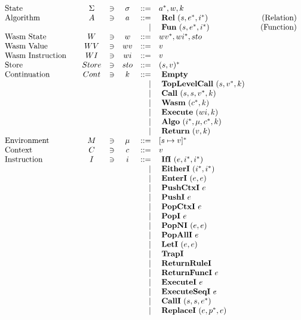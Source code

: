 \begin{align*}
\begin{array}{lcccrlr}
%
  \text{State}\quad& \Sigma &\ni& \sigma & ::=& \seq a, w, k \\
%
  \text{Algorithm}\quad& A &\ni& a &::=& ~ \rel ~ (s, \seq e, \seq i) &\quad\text{(Relation)} \\
  &&&& | & ~ \fun ~ (s, \seq e, \seq i) &\quad\text{(Function)} \\
%
  \text{Wasm State}\quad& W &\ni& w &::=& \seq{wv}, \seq{wi}, sto \\
  \text{Wasm Value}\quad& WV &\ni& wv &::=& v \\
  \text{Wasm Instruction}\quad& WI &\ni& wi &::=& v \\
%
  \text{Store}\quad& Store &\ni& sto &::=& \seq{(s, v)} \\
%
  \text{Continuation}\quad & Cont &\ni& k &::=& ~ \mt \\
    &&&& | & ~ \toplevelcall ~ (s, \seq v, k) \\
    &&&& | & ~ \call ~ (s, s, \seq v, k) \\
    &&&& | & ~ \wasm ~ (\seq c, k) \\
    &&&& | & ~ \exe ~ (wi, k) \\
    &&&& | & ~ \algo ~ (\seq i, \mu, \seq c, k) \\
    &&&& | & ~ \ret ~ (v, k) \\
%
  \text{Environment}\quad& M &\ni& \mu &::=& \seq{[s \mapsto v]} \\
%
  \text{Context}\quad& C &\ni& c &::=& v \\
%
  \text{Instruction}\quad& I &\ni& i &::=& ~ \ifi ~ (e, \seq i, \seq i) \\
    &&&& | & ~ \eitheri ~ (\seq i, \seq i) \\
    &&&& | & ~ \enteri ~ (e, e) \\
    &&&& | & ~ \pushctxi ~ e \\
    &&&& | & ~ \pushi ~ e \\
    &&&& | & ~ \popctxi ~ e \\
    &&&& | & ~ \popi ~ e \\
    &&&& | & ~ \popni ~ (e, e) \\
    &&&& | & ~ \popalli ~ e \\
    &&&& | & ~ \leti ~ (e, e) \\
    &&&& | & ~ \trapi \\
    &&&& | & ~ \returnrulei \\
    &&&& | & ~ \returnfunci ~ e \\
    &&&& | & ~ \executei ~ e \\
    &&&& | & ~ \executeseqi ~ e \\
    &&&& | & ~ \calli ~ (s, s, \seq{e}) \\
    &&&& | & ~ \replacei ~ (e, \seq{p}, e) \\
\end{array}
\end{align*}
